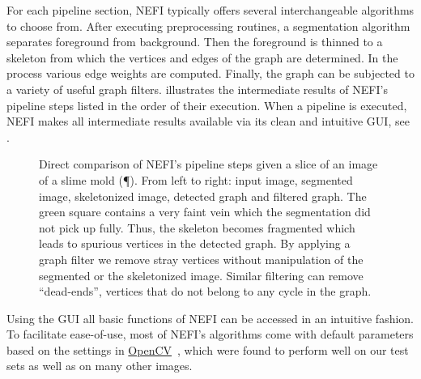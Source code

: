	For each pipeline section, NEFI typically offers several interchangeable algorithms to choose from. After executing preprocessing routines, a segmentation algorithm separates foreground from background. Then the foreground is thinned to a skeleton from which the vertices and edges of the graph are determined. In the process various edge weights are computed. Finally, the graph can be subjected to a variety of useful graph filters.  illustrates the intermediate results of NEFI's pipeline steps listed in the order of their execution. When a pipeline is executed, NEFI makes all intermediate results available via its clean and intuitive GUI, see . 

	\begin{figure}
		\centering
		\caption[short toc caption]{Direct comparison of NEFI's pipeline steps given a slice of an image of a slime mold (\P). From left to right: input image, segmented image, skeletonized image, detected graph and filtered graph. The green square contains a very faint vein which the segmentation did not pick up fully. Thus, the skeleton becomes fragmented which leads to spurious vertices in the detected graph. By applying a graph filter we remove stray vertices without manipulation of the segmented or the skeletonized image. Similar filtering can remove ``dead-ends'', \ie vertices that do not belong to any cycle in the graph.}
		\label{fig:pipeline}
	\end{figure}

	Using the GUI all basic functions of NEFI can be accessed in an intuitive fashion. To facilitate ease-of-use, most of NEFI's algorithms come with default parameters based on the settings in \href{http://opencv.org/}{OpenCV}~\cite{opencv}, which were found to perform well on our test sets as well as on many other images.

